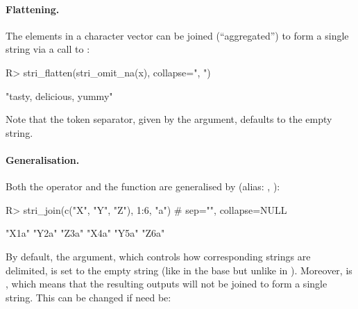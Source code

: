 \documentclass[nojss]{jss}
\begin{document}

%




\paragraph{Flattening.}
The elements in a character vector can be joined (``aggregated'')
to form a single string via a call to  :

\begin{Schunk}
\begin{Sinput}
R> stri_flatten(stri_omit_na(x), collapse=", ")
\end{Sinput}
\begin{Soutput}
[1] "tasty, delicious, yummy"
\end{Soutput}
\end{Schunk}

\noindent
Note that the token separator, given by the  argument,
defaults to the empty string.



\paragraph{Generalisation.}
Both the  operator and the  function
are generalised by
 (alias: , ):

\begin{Schunk}
\begin{Sinput}
R> stri_join(c("X", "Y", "Z"), 1:6, "a")  # sep="", collapse=NULL
\end{Sinput}
\begin{Soutput}
[1] "X1a" "Y2a" "Z3a" "X4a" "Y5a" "Z6a"
\end{Soutput}
\end{Schunk}

By default, the  argument, which controls how corresponding
strings are delimited, is set to the empty string
(like in the base  but unlike in ).
Moreover,  is , which means that
the resulting outputs will not be joined to form a single string.
This can be changed if need be:
\end{document}
